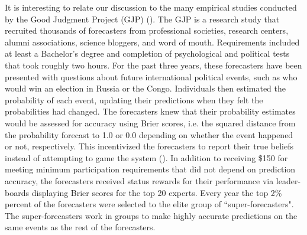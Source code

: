 \documentclass[11pt]{article}
\theoremstyle{definition}
\theoremstyle{definition}
\begin{document}
It is interesting to relate our discussion to the many empirical studies conducted by the Good Judgment Project (GJP) (\cite{mellers2014psychological, ungar2012good}). The GJP is a research study that recruited thousands of forecasters from professional societies, research centers, alumni associations, science bloggers, and word of mouth. Requirements included at least a Bachelor's degree and completion of psychological and political tests that took roughly two hours. For the past three years, these forecasters have been presented with questions about future international political events, such as who would win an election in Russia or the Congo. Individuals then estimated the probability of each event,  updating their predictions when they felt the probabilities had changed. The forecasters knew that their probability estimates would be assessed for accuracy using Brier scores, i.e. the squared distance from the  probability forecast to 1.0 or 0.0 depending on whether the event happened or not, respectively. This incentivized the forecasters to report their true beliefs instead of attempting to game the system (\citet{winkler1968good}). In addition to receiving \$150 for meeting minimum participation requirements that did not depend on prediction accuracy, the forecasters received status rewards for their performance via leader-boards displaying Brier scores for the top 20 experts. Every year the top 2\% percent of the forecasters were selected to the elite group of ``super-forecasters". The super-forecasters work in groups to make highly accurate predictions on the same events as the rest of the forecasters. 


\end{document}
